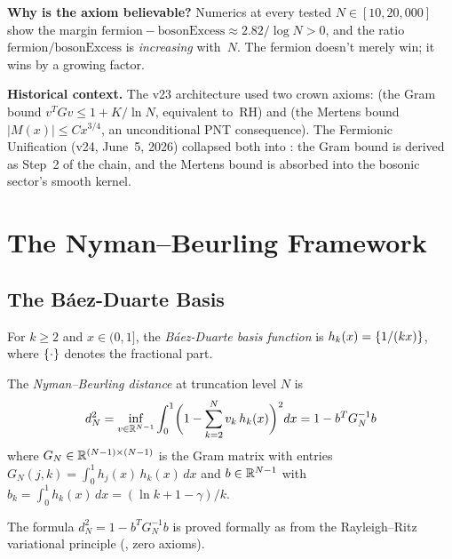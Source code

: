 \documentclass[11pt,a4paper]{article}
\begin{document}
\medskip\noindent
\textbf{Why is the axiom believable?}
Numerics at every tested $N \in [10, 20{,}000]$ show the margin
$\mathrm{fermion} - \mathrm{bosonExcess} \approx 2.82/\log N > 0$,
and the ratio $\mathrm{fermion}/\mathrm{bosonExcess}$ is
\emph{increasing} with~$N$. The fermion doesn't merely win; it wins
by a growing factor.

\medskip\noindent
\textbf{Historical context.}
The v23 architecture used two crown axioms:
 (the Gram bound
$v^T G v \leq 1 + K/\ln N$, equivalent to~RH) and
 (the Mertens bound
$|M(x)| \leq Cx^{3/4}$, an unconditional PNT consequence).
The Fermionic Unification (v24, June~5, 2026) collapsed both into
: the Gram bound is derived as
Step~2 of the chain, and the Mertens bound is absorbed into the
bosonic sector's smooth kernel.

\section{The Nyman--Beurling Framework}
\label{sec:framework}

\subsection{The B\'aez-Duarte Basis}

\begin{definition}
For $k \geq 2$ and $x \in (0,1]$, the \emph{B\'aez-Duarte basis
function} is $h_k(x) = \{1/(kx)\}$, where $\{\cdot\}$
denotes the fractional part.
\end{definition}

\begin{definition}
The \emph{Nyman--Beurling distance} at truncation level $N$ is
\[
  d_N^2 = \inf_{v \in \mathbb{R}^{N-1}} \int_0^1
    \biggl(1 - \sum_{k=2}^{N} v_k\,h_k(x)\biggr)^2 dx
  = 1 - b^T G_N^{-1} b
\]
where $G_N \in \mathbb{R}^{(N-1) \times (N-1)}$ is the Gram matrix with
entries $G_N(j,k) = \int_0^1 h_j(x)\,h_k(x)\,dx$ and
$b \in \mathbb{R}^{N-1}$ with $b_k = \int_0^1 h_k(x)\,dx = (\ln k + 1 - \gamma)/k$.
\end{definition}

The formula $d_N^2 = 1 - b^T G_N^{-1} b$ is proved formally
as  from the Rayleigh--Ritz variational
principle (, zero axioms).
\end{document}

